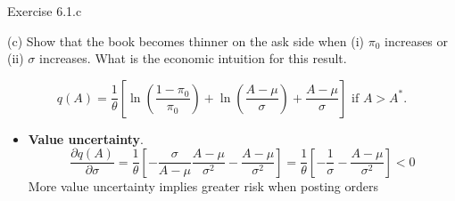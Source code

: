 \documentclass[english,10pt
,aspectratio=169
]{beamer}
\begin{document}
\begin{frame}{Exercise 6.1.c}
	\begin{exampleblock}{}
		(c) Show that the book becomes thinner on the ask side when (i) $\pi_0$ increases or (ii) $\sigma$ increases. What is the economic intuition for this result.
	\end{exampleblock}

	$$
		q(A)=\frac{1}{\theta} \left[\ln \left(\frac{1-\pi_0}{\pi_0}\right) + \ln \left(\frac{A-\mu}{\sigma}\right) + \frac{A-\mu}{\sigma}\right]\text{ if } A>A^*.
	$$
	
	\begin{itemize}
		\item \textbf{Value uncertainty}. 
		\[
		\frac{\partial q(A)}{\partial \sigma} = \frac{1}{\theta} \left[ -\frac{\sigma}{A-\mu}\frac{A-\mu}{\sigma^2} - \frac{A-\mu}{\sigma^2}\right]=\frac{1}{\theta} \left[ -\frac{1}{\sigma} - \frac{A-\mu}{\sigma^2}\right]<0
		\]
		More value uncertainty implies greater risk when posting orders
	\end{itemize}
\end{frame}
\end{document}
